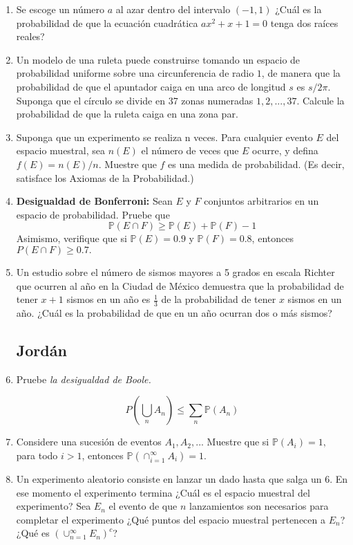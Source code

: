 \begin{enumerate}
\item Se escoge un número $a$ al azar dentro del intervalo $(-1,1)$ ¿Cuál es la probabilidad de que la ecuación cuadrática $ax^2 + x + 1 = 0$ tenga dos raíces reales?

\item Un modelo de una ruleta puede construirse tomando un espacio de probabilidad uniforme sobre una circunferencia de radio $1$, de manera que la probabilidad de que el apuntador caiga en una arco de longitud $s$ es $s/2\pi$. Suponga que el círculo se divide en 37 zonas numeradas $1, 2, . . . , 37$. Calcule la probabilidad de que la ruleta caiga en una zona par.

\item Suponga que un experimento se realiza n veces. Para cualquier evento $E$ del espacio muestral, sea $n(E)$ el número de veces que $E$ ocurre, y defina $f(E) = n(E)/n$. Muestre que $f$ es una medida de probabilidad. (Es decir, satisface los Axiomas de la Probabilidad.)

\item \textbf{Desigualdad de Bonferroni:}
Sean $E$ y $F$ conjuntos arbitrarios en un espacio de probabilidad. Pruebe que
\[
\mathbb{P}(E \cap F) \ge \mathbb{P}(E) + \mathbb{P}(F) - 1
\]
Asimismo, verifique que si $\mathbb{P}(E) = 0.9$ y $\mathbb{P}(F) = 0.8$, entonces $P(E \cap F ) \ge 0.7.$  

\item Un estudio sobre el número de sismos mayores a 5 grados en escala Richter que ocurren al año en la Ciudad de México demuestra que la probabilidad de tener $x+1$ sismos en un año es $\frac{1}{3}$ de la probabilidad de tener $x$ sismos en un año. ¿Cuál es la probabilidad de que en un año ocurran dos o más sismos?

\subsection*{Jordán}

\item Pruebe \textit{la desigualdad de Boole.}

$$ P(\bigcup_n A_n) \le \sum_n \mathbb{P}(A_n)$$

\item Considere una sucesión de eventos $A_1, A_2,...$ Muestre que si $\mathbb{P}(A_i) = 1,$ para todo $i>1$, entonces $\mathbb{P}(\cap_{i = 1}^{\infty} A_i) = 1.$

\item Un experimento aleatorio consiste en lanzar un dado hasta que salga un 6. En ese momento el experimento termina ¿Cuál es el espacio muestral del experimento? Sea $E_n$ el evento de que $n$ lanzamientos son necesarios para completar el experimento ¿Qué puntos del espacio muestral pertenecen a $E_n$? ¿Qué es $(\cup_{n=1}^{\infty} E_n)^c$?


\end{enumerate}
